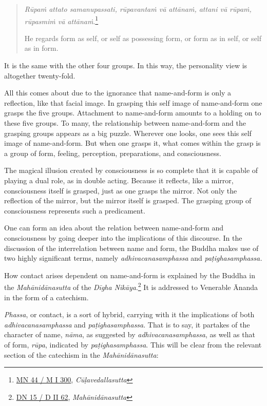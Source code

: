 \begin{quote}
\emph{Rūpaṁ attato samanupassati, rūpavantaṁ vā attānaṁ, attani vā rūpaṁ, rūpasmiṁ vā attānaṁ}.\footnote{\href{https://suttacentral.net/mn44/pli/ms}{MN 44 / M I 300}, \emph{Cūḷavedallasutta}}

He regards form as self, or self as possessing form, or form as in self, or self as in form.
\end{quote}

It is the same with the other four groups. In this way, the personality view is altogether twenty-fold.

All this comes about due to the ignorance that name-and-form is only a reflection, like that facial image. In grasping this self image of name-and-form one grasps the five groups. Attachment to name-and-form amounts to a holding on to these five groups. To many, the relationship between name-and-form and the grasping groups appears as a big puzzle. Wherever one looks, one sees this self image of name-and-form. But when one grasps it, what comes within the grasp is a group of form, feeling, perception, preparations, and consciousness.

The magical illusion created by consciousness is so complete that it is capable of playing a dual role, as in double acting. Because it reflects, like a mirror, consciousness itself is grasped, just as one grasps the mirror. Not only the reflection of the mirror, but the mirror itself is grasped. The grasping group of consciousness represents such a predicament.

One can form an idea about the relation between name-and-form and consciousness by going deeper into the implications of this discourse. In the discussion of the interrelation between name and form, the Buddha makes use of two highly significant terms, namely \emph{adhivacanasamphassa} and \emph{paṭighasamphassa.}

How contact arises dependent on name-and-form is explained by the Buddha in the \emph{Mahānidānasutta} of the \emph{Dīgha Nikāya}.\footnote{\href{https://suttacentral.net/dn15/pli/ms}{DN 15 / D II 62}, \emph{Mahānidānasutta}} It is addressed to Venerable Ānanda in the form of a catechism.

\emph{Phassa}, or contact, is a sort of hybrid, carrying with it the implications of both \emph{adhivacanasamphassa} and \emph{paṭighasamphassa}. That is to say, it partakes of the character of name, \emph{nāma}, as suggested by \emph{adhivacanasamphassa}, as well as that of form, \emph{rūpa}, indicated by \emph{paṭighasamphassa}. This will be clear from the relevant section of the catechism in the \emph{Mahānidānasutta}:

